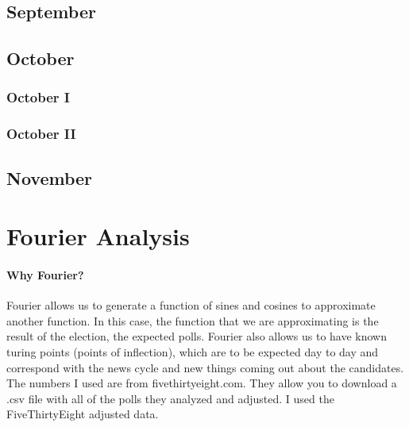 \documentclass[twoside]{article}
\begin{document}
\subsection{September}
\subsection{October}
\subsubsection{October I}
\subsubsection{October II}
\subsection{November}
\newpage
\section{Fourier Analysis}
\vskip4cm
\paragraph{Why Fourier?} Fourier allows us to generate a function of sines and cosines to approximate another function. In this case, the function that we are approximating
is the result of the election, the expected polls. Fourier also allows us to have known turing points (points of inflection), which are to be expected day to day and correspond
with the news cycle and new things coming out about the candidates. The numbers I used are from fivethirtyeight.com. They allow you to download a .csv file with all of the polls they
analyzed and adjusted. I used the FiveThirtyEight adjusted data.

\newpage
\end{document}
